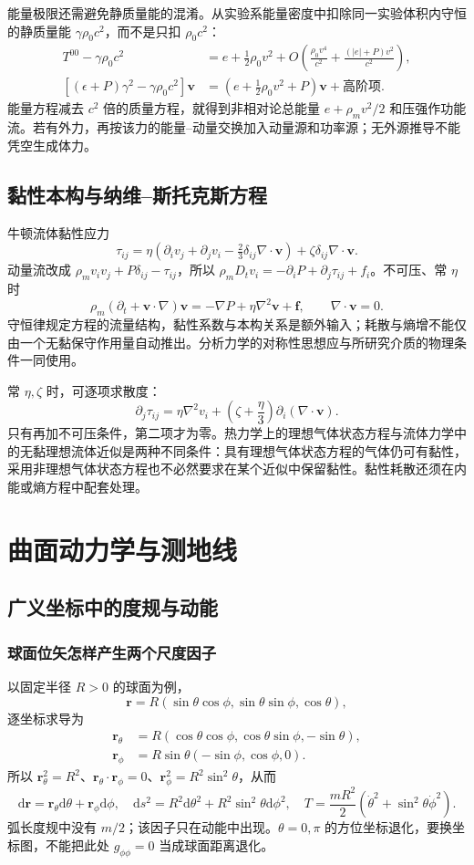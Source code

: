 \documentclass[UTF8,zihao=-4,fontset=fandol,a4paper]{ctexart}
\newcommand{\vect}[1]{\bm{#1}}\newcommand{\dd}{\mathrm d}\newcommand{\pd}{\partial}
\begin{document}
能量极限还需避免静质量能的混淆。从实验系能量密度中扣除同一实验体积内守恒的静质量能 $\gamma\rho_0c^2$，而不是只扣 $\rho_0c^2$：
\begin{align*}
T^{00}-\gamma\rho_0c^2
&=e+\frac12\rho_0v^2
+O\!\left(\frac{\rho_0v^4}{c^2}+\frac{(|e|+P)v^2}{c^2}\right),\\
[(\epsilon+P)\gamma^2-\gamma\rho_0c^2]\vect v
&=\left(e+\frac12\rho_0v^2+P\right)\vect v
+\text{高阶项}.
\end{align*}
能量方程减去 $c^2$ 倍的质量方程，就得到非相对论总能量 $e+\rho_m v^2/2$ 和压强作功能流。若有外力，再按该力的能量--动量交换加入动量源和功率源；无外源推导不能凭空生成体力。
\subsection{黏性本构与纳维--斯托克斯方程}
牛顿流体黏性应力
\[
\tau_{ij}=\eta(\partial_iv_j+\partial_jv_i-\tfrac23\delta_{ij}\nabla\cdot\vect v)
+\zeta\delta_{ij}\nabla\cdot\vect v.
\]
动量流改成 $\rho_mv_iv_j+P\delta_{ij}-\tau_{ij}$，所以 $\rho_mD_t v_i=-\partial_iP+\partial_j\tau_{ij}+f_i$。不可压、常 $\eta$ 时
\[
\rho_m(\partial_t+\vect v\cdot\nabla)\vect v=-\nabla P+\eta\nabla^2\vect v+\vect f,
\qquad\nabla\cdot\vect v=0.
\]
守恒律规定方程的流量结构，黏性系数与本构关系是额外输入；耗散与熵增不能仅由一个无黏保守作用量自动推出。分析力学的对称性思想应与所研究介质的物理条件一同使用。

常 $\eta,\zeta$ 时，可逐项求散度：
\[
\partial_j\tau_{ij}
=\eta\nabla^2v_i+\left(\zeta+\frac\eta3\right)\partial_i(\nabla\cdot\vect v).
\]
只有再加不可压条件，第二项才为零。热力学上的理想气体状态方程与流体力学中的无黏理想流体近似是两种不同条件：具有理想气体状态方程的气体仍可有黏性，采用非理想气体状态方程也不必然要求在某个近似中保留黏性。黏性耗散还须在内能或熵方程中配套处理。


\section{曲面动力学与测地线}\label{sec:geodesic}
\subsection{广义坐标中的度规与动能}

\subsubsection*{球面位矢怎样产生两个尺度因子}
以固定半径 $R>0$ 的球面为例，
\[
\vect r=R(\sin\theta\cos\phi,\sin\theta\sin\phi,\cos\theta),
\]
逐坐标求导为
\begin{align*}
\vect r_\theta&=R(\cos\theta\cos\phi,\cos\theta\sin\phi,-\sin\theta),\\
\vect r_\phi&=R\sin\theta(-\sin\phi,\cos\phi,0).
\end{align*}
所以 $\vect r_\theta^2=R^2$、$\vect r_\theta\cdot\vect r_\phi=0$、$\vect r_\phi^2=R^2\sin^2\theta$，从而
\[
\dd\vect r=\vect r_\theta\dd\theta+\vect r_\phi\dd\phi,
\quad\dd s^2=R^2\dd\theta^2+R^2\sin^2\theta\dd\phi^2,
\quad T=\frac{mR^2}{2}(\dot\theta^2+\sin^2\theta\dot\phi^2).
\]
弧长度规中没有 $m/2$；该因子只在动能中出现。$\theta=0,\pi$ 的方位坐标退化，要换坐标图，不能把此处 $g_{\phi\phi}=0$ 当成球面距离退化。
\end{document}
